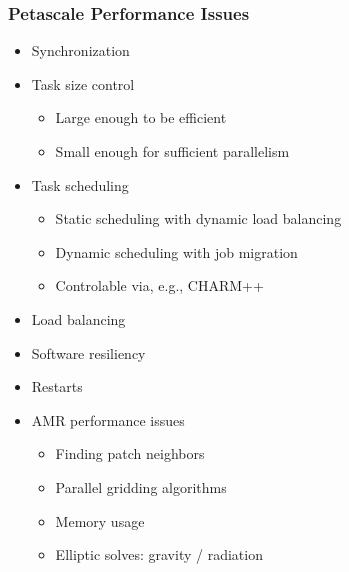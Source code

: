 \documentclass{beamer}
\begin{document}
    \begin{frame}[fragile] \frametitle{Petascale Performance Issues}
      \begin{itemize}
        \item Synchronization
        \item Task size control
        \begin{itemize}
          \item Large enough to be efficient
          \item Small enough for sufficient parallelism
        \end{itemize}
        \item Task scheduling
        \begin{itemize}
          \item Static scheduling with dynamic load balancing
          \item Dynamic scheduling with job migration
          \item Controlable via, e.g., CHARM++
        \end{itemize}
        \item Load balancing
        \item Software resiliency
        \item Restarts
        \item AMR performance issues
        \begin{itemize}
          \item Finding patch neighbors
          \item Parallel gridding algorithms
          \item Memory usage
          \item Elliptic solves: gravity / radiation
        \end{itemize}
      \end{itemize}
\end{frame}
\end{document}
